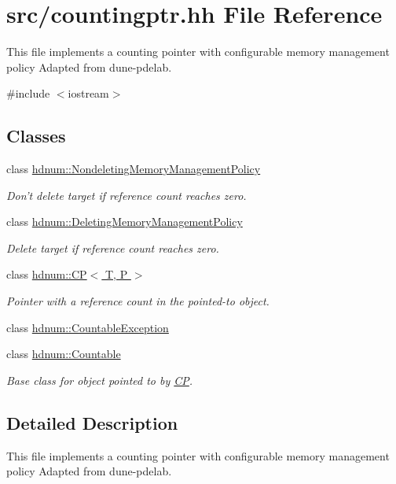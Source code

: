 \hypertarget{countingptr_8hh}{
\section{src/countingptr.hh File Reference}
\label{countingptr_8hh}
}


This file implements a counting pointer with configurable memory management policy Adapted from dune-\/pdelab.  


{\ttfamily \#include $<$iostream$>$}\par
\subsection*{Classes}
\begin{DoxyCompactItemize}
\item 
class \hyperlink{classhdnum_1_1NondeletingMemoryManagementPolicy}{hdnum::NondeletingMemoryManagementPolicy}
\begin{DoxyCompactList}\small\item\em Don't delete target if reference count reaches zero. \item\end{DoxyCompactList}\item 
class \hyperlink{classhdnum_1_1DeletingMemoryManagementPolicy}{hdnum::DeletingMemoryManagementPolicy}
\begin{DoxyCompactList}\small\item\em Delete target if reference count reaches zero. \item\end{DoxyCompactList}\item 
class \hyperlink{classhdnum_1_1CP}{hdnum::CP$<$ T, P $>$}
\begin{DoxyCompactList}\small\item\em Pointer with a reference count in the pointed-\/to object. \item\end{DoxyCompactList}\item 
class \hyperlink{classhdnum_1_1CountableException}{hdnum::CountableException}
\item 
class \hyperlink{classhdnum_1_1Countable}{hdnum::Countable}
\begin{DoxyCompactList}\small\item\em Base class for object pointed to by \hyperlink{classhdnum_1_1CP}{CP}. \item\end{DoxyCompactList}\end{DoxyCompactItemize}


\subsection{Detailed Description}
This file implements a counting pointer with configurable memory management policy Adapted from dune-\/pdelab. 